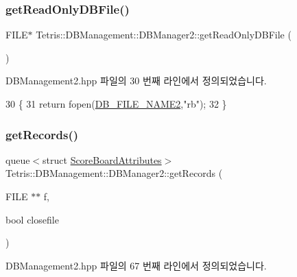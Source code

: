 \subsubsection{\texorpdfstring{get\+Read\+Only\+D\+B\+File()}{getReadOnlyDBFile()}}
{\footnotesize\ttfamily F\+I\+LE$\ast$ Tetris\+::\+D\+B\+Management\+::\+D\+B\+Manager2\+::get\+Read\+Only\+D\+B\+File (\begin{DoxyParamCaption}{ }\end{DoxyParamCaption})\hspace{0.3cm}{\ttfamily [inline]}}



D\+B\+Management2.\+hpp 파일의 30 번째 라인에서 정의되었습니다.


\begin{DoxyCode}
30                                      \{
31                 \textcolor{keywordflow}{return} fopen(\hyperlink{_base_d_b_management_8hpp_a2ee22b58bca5e7989febcffafa7d017d}{DB\_FILE\_NAME2},\textcolor{stringliteral}{"rb"});
32             \}
\end{DoxyCode}
\mbox{\label{class_tetris_1_1_d_b_management_1_1_d_b_manager2_a50f96af6082825b0a11b4090e9e863e1}} 
\subsubsection{\texorpdfstring{get\+Records()}{getRecords()}}
{\footnotesize\ttfamily queue$<$struct \hyperlink{struct_tetris_1_1_d_b_management_1_1_score_board_attributes}{Score\+Board\+Attributes}$>$ Tetris\+::\+D\+B\+Management\+::\+D\+B\+Manager2\+::get\+Records (\begin{DoxyParamCaption}\item[{F\+I\+LE $\ast$$\ast$}]{f,  }\item[{bool}]{closefile }\end{DoxyParamCaption})\hspace{0.3cm}{\ttfamily [inline]}}



D\+B\+Management2.\+hpp 파일의 67 번째 라인에서 정의되었습니다.


